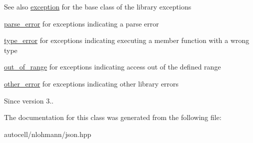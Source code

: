 \begin{DoxySeeAlso}{See also}
\mbox{\hyperlink{classnlohmann_1_1detail_1_1exception}{exception}} for the base class of the library exceptions 

\mbox{\hyperlink{classnlohmann_1_1detail_1_1parse__error}{parse\+\_\+error}} for exceptions indicating a parse error 

\mbox{\hyperlink{classnlohmann_1_1detail_1_1type__error}{type\+\_\+error}} for exceptions indicating executing a member function with a wrong type 

\mbox{\hyperlink{classnlohmann_1_1detail_1_1out__of__range}{out\+\_\+of\+\_\+range}} for exceptions indicating access out of the defined range 

\mbox{\hyperlink{classnlohmann_1_1detail_1_1other__error}{other\+\_\+error}} for exceptions indicating other library errors
\end{DoxySeeAlso}
\begin{DoxySince}{Since}
version 3.. 
\end{DoxySince}


The documentation for this class was generated from the following file\+:\begin{DoxyCompactItemize}
\item 
autocell/nlohmann/json.\+hpp\end{DoxyCompactItemize}
